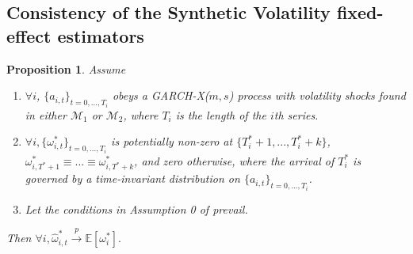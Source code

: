 \documentclass[11pt]{article}
\def\mbf#1{\mathbf{#1}} %
\def\t#1{\tilde{#1}} %
\def\mc#1{\mathcal{#1}} %
\def\E{\mathbb{E}} %
\def\mc#1{\mathcal{#1}}
\newtheorem{prop}{Proposition}
\theoremstyle{definition}
\newenvironment{proof-of-proposition}[1][{}]{\noindent{\bf
    Proof of Proposition {#1}}
  \hspace*{.5em}}{\qed\bigskip\\}
\begin{document}

\subsection{Consistency of the Synthetic Volatility fixed-effect estimators}

\begin{prop}\label{consistency} Assume
\begin{enumerate}
  \item $\forall i$, $\{a_{i,t}\}_{t=0,...,T_i}$ obeys a GARCH-X($m,s$) process with volatility shocks found in either $\mc{M}_1$ or $\mc{M}_2$, where $T_i$ is the length of the $i$th series.
  \item $\forall i, \{\omega_{i,t}^{*}\}_{t=0,...,T_i}$ is potentially non-zero at $\{T^{*}_{i}+1,... ,T^{*}_{i}+k\}$, $\omega_{i,T^{*}+1}^{*}\equiv...\equiv\omega_{i,T^{*}+k}^{*}$, and zero otherwise, where the arrival of $T_{i}^{*}$ is governed by a time-invariant distribution on $\{a_{i,t}\}_{t=0,...,T_i}$. \label{stationarity_of_omega_i_t}
  \item Let the conditions in Assumption 0 of \citet{han2014asymptotic} prevail.
\end{enumerate}
Then $\forall i, \hat\omega_{i,t}^{*} \xrightarrow{p} \E[\omega_{i}^{*}].$
\end{prop}
\end{document}
